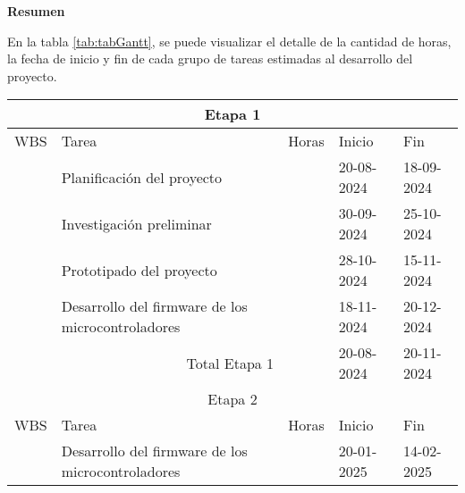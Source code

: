 \textbf{Resumen}

En la tabla \ref{tab:tabGantt}, se puede visualizar el detalle de la cantidad
de horas, la fecha de inicio y fin de cada grupo de tareas estimadas al
desarrollo del proyecto.

\begin{table}[ht]
	\begin{tabularx}{\linewidth}{|p{0.8cm}|p{8.33cm}|p{1cm}|p{1.8cm}|p{1.8cm}|}
		\hline
		\multicolumn{5}{|c|}{Etapa 1}                                                                                                       \\ \hline
		\rowcolor[HTML]{C0C0C0}
		WBS                                 & Tarea                                             & Horas           & Inicio     & Fin        \\ \hline
		\centering{1}                       & Planificación del proyecto                        & \raggedleft{50} & 20-08-2024 & 18-09-2024 \\ \hline
		\centering{2}                       & Investigación preliminar                          & \raggedleft{80} & 30-09-2024 & 25-10-2024 \\ \hline
		\centering{3}                       & Prototipado del proyecto                          & \raggedleft{30} & 28-10-2024 & 15-11-2024 \\ \hline
		\centering{4}                       & Desarrollo del firmware de los microcontroladores & \raggedleft{67} & 18-11-2024 & 20-12-2024 \\ \hline
		\multicolumn{2}{|r|}{Total Etapa 1} & \raggedleft{227}                                  & 20-08-2024      & 20-11-2024              \\ \hline
		\multicolumn{5}{|c|}{Etapa 2}                                                                                                       \\ \hline
		\rowcolor[HTML]{C0C0C0}
		WBS                                 & Tarea                                             & Horas           & Inicio     & Fin        \\ \hline
		\centering{4}                       & Desarrollo del firmware de los microcontroladores & \raggedleft{60} & 20-01-2025 & 14-02-2025 \\ \hline

\end{tabularx}
\end{table}

